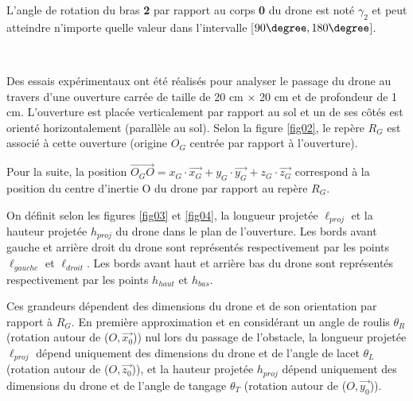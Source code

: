 L'angle de rotation du bras \textbf{2} par rapport au corps \textbf{0} du drone est noté $\gamma_2$ et peut atteindre n'importe quelle valeur dans l'intervalle [$90\degree, 180\degree$].



~\

Des essais expérimentaux ont été réalisés pour analyser le passage du drone au travers d'une ouverture carrée de taille de 20 cm × 20 cm et de profondeur de 1 cm. L'ouverture est placée verticalement par rapport au sol et un de ses côtés est orienté horizontalement (parallèle au sol). Selon la figure \ref{fig02}, le repère $R_G$ est associé à cette ouverture (origine $O_G$ centrée par rapport à l'ouverture).

Pour la suite, la position $\overrightarrow{O_GO}=x_G\cdot \vec{x_G}+y_G\cdot \vec{y_G}+z_G\cdot \vec{z_G}$ correspond à la position du centre d'inertie O du drone par rapport au repère $R_G$.

On définit selon les figures \ref{fig03} et \ref{fig04}, la longueur projetée $\ell_{proj}$ et la hauteur projetée $h_{proj}$ du drone dans le plan de l'ouverture. Les bords avant gauche et arrière droit du drone sont représentés respectivement par les points $\ell_{gauche}$ et $\ell_{droit}$. Les bords avant haut et arrière bas
du drone sont représentés respectivement par les points $h_{haut}$ et $h_{bas}$.

Ces grandeurs dépendent des dimensions du drone et de son orientation par rapport à $R_G$. En première approximation et en considérant un angle de roulis $\theta_R$ (rotation autour de ($O, \vec{x_0}$)) nul lors du passage de l'obstacle, la longueur projetée $\ell_{proj}$ dépend uniquement des dimensions
du drone et de l'angle de lacet $\theta_L$ (rotation autour de ($O,\vec{z_0}$)), et la hauteur projetée $h_{proj}$ dépend uniquement des dimensions du drone et de l'angle de tangage $\theta_T$ (rotation autour de ($O,\vec{y_0}$)).

\newpage

